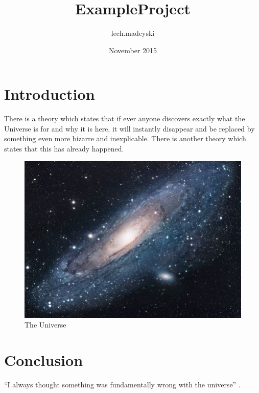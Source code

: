 \documentclass{article}
\title{ExampleProject}
\author{lech.madeyski }
\date{November 2015}
\begin{document}
\maketitle

\section{Introduction}
There is a theory which states that if ever anyone discovers exactly what the Universe is for and why it is here, it will instantly disappear and be replaced by something even more bizarre and inexplicable.
There is another theory which states that this has already happened.

\begin{figure}[h!]
\centering
\includegraphics[scale=1.7]{ExampleProjectTest.jpg}
\caption{The Universe}
\label{fig:univerise}
\end{figure}

\section{Conclusion}
``I always thought something was fundamentally wrong with the universe'' \citep{Adams95}.



\end{document}
